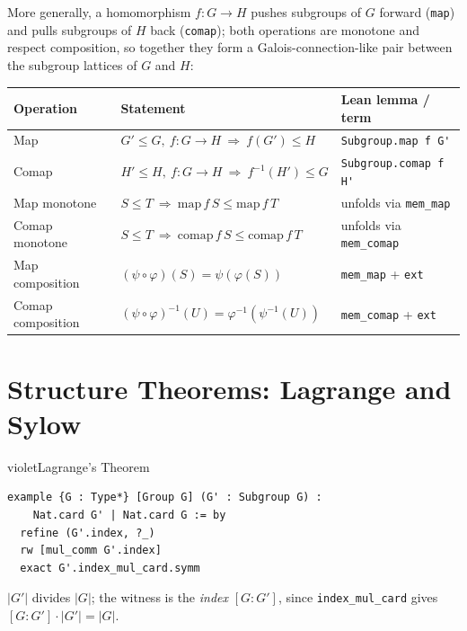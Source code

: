 \documentclass[11pt]{article}
\begin{document}
More generally, a homomorphism $f:G\to H$ pushes subgroups of $G$ forward (\texttt{map}) and pulls subgroups of $H$ back (\texttt{comap}); both operations are monotone and respect composition, so together they form a Galois-connection-like pair between the subgroup lattices of $G$ and $H$:

\renewcommand{\arraystretch}{1.3}
\begin{center}
\begin{tabular}{@{}p{2.6cm}p{6.4cm}p{5cm}@{}}
\toprule
\textbf{Operation} & \textbf{Statement} & \textbf{Lean lemma / term} \\
\midrule
Map & $G'\le G,\ f:G\to H \ \Rightarrow\ f(G')\le H$ & \verb|Subgroup.map f G'| \\
Comap & $H'\le H,\ f:G\to H \ \Rightarrow\ f^{-1}(H')\le G$ & \verb|Subgroup.comap f H'| \\
Map monotone & $S\le T \ \Rightarrow\ \mathrm{map}\,f\,S \le \mathrm{map}\,f\,T$ & unfolds via \verb|mem_map| \\
Comap monotone & $S\le T \ \Rightarrow\ \mathrm{comap}\,f\,S \le \mathrm{comap}\,f\,T$ & unfolds via \verb|mem_comap| \\
Map composition & $(\psi\circ\varphi)(S) = \psi(\varphi(S))$ & \verb|mem_map| + \verb|ext| \\
Comap composition & $(\psi\circ\varphi)^{-1}(U) = \varphi^{-1}(\psi^{-1}(U))$ & \verb|mem_comap| + \verb|ext| \\
\bottomrule
\end{tabular}
\end{center}

\section{Structure Theorems: Lagrange and Sylow}

\begin{defbox}{violet}{Lagrange's Theorem}
\begin{lstlisting}
example {G : Type*} [Group G] (G' : Subgroup G) :
    Nat.card G' | Nat.card G := by
  refine (G'.index, ?_)
  rw [mul_comm G'.index]
  exact G'.index_mul_card.symm
\end{lstlisting}
$|G'|$ divides $|G|$; the witness is the \emph{index} $[G:G']$, since \verb|index_mul_card| gives $[G:G']\cdot|G'|=|G|$.
\end{defbox}
\end{document}

